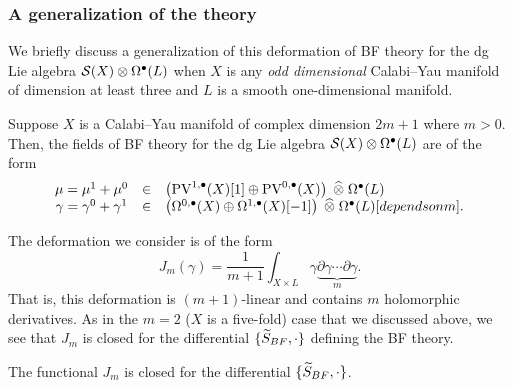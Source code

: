 \documentclass[11pt]{amsart}
\def\pv{{\rm PV}}
\begin{document}

\subsubsection{A generalization of the theory}

We briefly discuss a generalization of this deformation of BF theory for the dg Lie algebra $\cS(X) \otimes \Omega^\bu(L)$ when $X$ is any {\em odd dimensional} Calabi--Yau manifold of dimension at least three and $L$ is a smooth one-dimensional manifold.

Suppose $X$ is a Calabi--Yau manifold of complex dimension $2m+1$ where $m > 0$.
Then, the fields of BF theory for the dg Lie algebra $\cS(X) \otimes \Omega^{\bu}(L)$ are of the form
\[
  \begin{array}{ccl}
    \mu = \mu^1+\mu^0 & \in & \left(\pv^{1,\bu}(X)[1] \oplus \pv^{0,\bu}(X) \right) \; \Hat{\otimes} \; \Omega^{\bu}(L) \\
    \gamma = \gamma^0 + \gamma^1 & \in & \left(\Omega^{0,\bu}(X) \oplus \Omega^{1,\bu}(X)[-1] \right) \; \Hat{\otimes}\; \Omega^{\bu}(L)[depends on m] .
  \end{array}
\]

The deformation we consider is of the form
\[
  J_m (\gamma) = \frac{1}{m+1} \int_{X \times L} \gamma \underbrace{\partial \gamma \cdots \partial \gamma}_{m} .
\]
That is, this deformation is $(m+1)$-linear and contains $m$ holomorphic derivatives.
As in the $m=2$ ($X$ is a five-fold) case that we discussed above, we see that $J_m$ is closed for the differential $\{\Tilde{S}_{BF},\cdot\}$ defining the BF theory.

\begin{lem}
  The functional $J_m$ is closed for the differential $\{\Tilde{S}_{BF}, \cdot \}$.
\end{lem}
\end{document}
